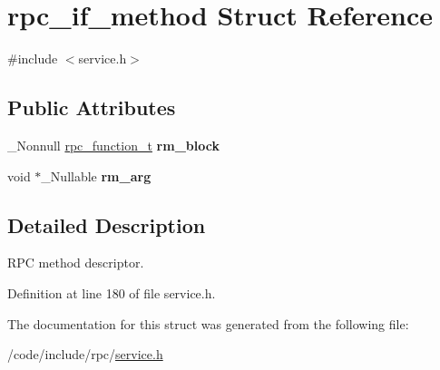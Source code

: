 \hypertarget{structrpc__if__method}{}\section{rpc\+\_\+if\+\_\+method Struct Reference}
\label{structrpc__if__method}


{\ttfamily \#include $<$service.\+h$>$}

\subsection*{Public Attributes}
\begin{DoxyCompactItemize}
\item 
\+\_\+\+Nonnull \hyperlink{service_8h_ae49a22468cfcd4adfa558078e9e4e312}{rpc\+\_\+function\+\_\+t} {\bfseries rm\+\_\+block}\hypertarget{structrpc__if__method_a5db192112740ed1adb36f74ff7c92a80}{}\label{structrpc__if__method_a5db192112740ed1adb36f74ff7c92a80}

\item 
void $\ast$\+\_\+\+Nullable {\bfseries rm\+\_\+arg}\hypertarget{structrpc__if__method_a85a2f339a726ef4afb885cbf157c0998}{}\label{structrpc__if__method_a85a2f339a726ef4afb885cbf157c0998}

\end{DoxyCompactItemize}


\subsection{Detailed Description}
R\+PC method descriptor. 

Definition at line 180 of file service.\+h.



The documentation for this struct was generated from the following file\+:\begin{DoxyCompactItemize}
\item 
/code/include/rpc/\hyperlink{service_8h}{service.\+h}\end{DoxyCompactItemize}
